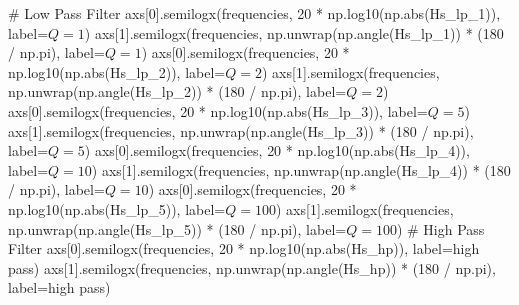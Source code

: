 \documentclass[
  letterpaper,
]{scrbook}
\newenvironment{Shaded}{}{}
\newcommand{\BuiltInTok}[1]{\textcolor[rgb]{0.84,0.23,0.29}{#1}}
\newcommand{\CommentTok}[1]{\textcolor[rgb]{0.42,0.45,0.49}{#1}}
\newcommand{\DecValTok}[1]{\textcolor[rgb]{0.00,0.36,0.77}{#1}}
\newcommand{\NormalTok}[1]{\textcolor[rgb]{0.14,0.16,0.18}{#1}}
\newcommand{\OperatorTok}[1]{\textcolor[rgb]{0.14,0.16,0.18}{#1}}
\newcommand{\StringTok}[1]{\textcolor[rgb]{0.01,0.18,0.38}{#1}}
\begin{document}
\begin{codelisting}
{\begin{Shaded}
\begin{Highlighting}[]
\CommentTok{\# Low Pass Filter}
\NormalTok{axs[}\DecValTok{0}\NormalTok{].semilogx(frequencies, }\DecValTok{20} \OperatorTok{*}\NormalTok{ np.log10(np.}\BuiltInTok{abs}\NormalTok{(Hs\_lp\_1)), label}\OperatorTok{=}\StringTok{\textquotesingle{}$Q = 1$\textquotesingle{}}\NormalTok{)}
\NormalTok{axs[}\DecValTok{1}\NormalTok{].semilogx(frequencies, np.unwrap(np.angle(Hs\_lp\_1)) }\OperatorTok{*}\NormalTok{ (}\DecValTok{180} \OperatorTok{/}\NormalTok{ np.pi), label}\OperatorTok{=}\StringTok{\textquotesingle{}$Q = 1$\textquotesingle{}}\NormalTok{)}
\NormalTok{axs[}\DecValTok{0}\NormalTok{].semilogx(frequencies, }\DecValTok{20} \OperatorTok{*}\NormalTok{ np.log10(np.}\BuiltInTok{abs}\NormalTok{(Hs\_lp\_2)), label}\OperatorTok{=}\StringTok{\textquotesingle{}$Q = 2$\textquotesingle{}}\NormalTok{)}
\NormalTok{axs[}\DecValTok{1}\NormalTok{].semilogx(frequencies, np.unwrap(np.angle(Hs\_lp\_2)) }\OperatorTok{*}\NormalTok{ (}\DecValTok{180} \OperatorTok{/}\NormalTok{ np.pi), label}\OperatorTok{=}\StringTok{\textquotesingle{}$Q = 2$\textquotesingle{}}\NormalTok{)}
\NormalTok{axs[}\DecValTok{0}\NormalTok{].semilogx(frequencies, }\DecValTok{20} \OperatorTok{*}\NormalTok{ np.log10(np.}\BuiltInTok{abs}\NormalTok{(Hs\_lp\_3)), label}\OperatorTok{=}\StringTok{\textquotesingle{}$Q = 5$\textquotesingle{}}\NormalTok{)}
\NormalTok{axs[}\DecValTok{1}\NormalTok{].semilogx(frequencies, np.unwrap(np.angle(Hs\_lp\_3)) }\OperatorTok{*}\NormalTok{ (}\DecValTok{180} \OperatorTok{/}\NormalTok{ np.pi), label}\OperatorTok{=}\StringTok{\textquotesingle{}$Q = 5$\textquotesingle{}}\NormalTok{)}
\NormalTok{axs[}\DecValTok{0}\NormalTok{].semilogx(frequencies, }\DecValTok{20} \OperatorTok{*}\NormalTok{ np.log10(np.}\BuiltInTok{abs}\NormalTok{(Hs\_lp\_4)), label}\OperatorTok{=}\StringTok{\textquotesingle{}$Q = 10$\textquotesingle{}}\NormalTok{)}
\NormalTok{axs[}\DecValTok{1}\NormalTok{].semilogx(frequencies, np.unwrap(np.angle(Hs\_lp\_4)) }\OperatorTok{*}\NormalTok{ (}\DecValTok{180} \OperatorTok{/}\NormalTok{ np.pi), label}\OperatorTok{=}\StringTok{\textquotesingle{}$Q = 10$\textquotesingle{}}\NormalTok{)}
\NormalTok{axs[}\DecValTok{0}\NormalTok{].semilogx(frequencies, }\DecValTok{20} \OperatorTok{*}\NormalTok{ np.log10(np.}\BuiltInTok{abs}\NormalTok{(Hs\_lp\_5)), label}\OperatorTok{=}\StringTok{\textquotesingle{}$Q = 100$\textquotesingle{}}\NormalTok{)}
\NormalTok{axs[}\DecValTok{1}\NormalTok{].semilogx(frequencies, np.unwrap(np.angle(Hs\_lp\_5)) }\OperatorTok{*}\NormalTok{ (}\DecValTok{180} \OperatorTok{/}\NormalTok{ np.pi), label}\OperatorTok{=}\StringTok{\textquotesingle{}$Q = 100$\textquotesingle{}}\NormalTok{)}
\CommentTok{\textquotesingle{}\textquotesingle{}\textquotesingle{}}
\CommentTok{\# High Pass Filter}
\CommentTok{axs[0].semilogx(frequencies, 20 * np.log10(np.abs(Hs\_hp)), label=\textquotesingle{}high pass\textquotesingle{})}
\CommentTok{axs[1].semilogx(frequencies, np.unwrap(np.angle(Hs\_hp)) * (180 / np.pi), label=\textquotesingle{}high pass\textquotesingle{})}


\end{Highlighting}
\end{Shaded}}
\end{codelisting}
\end{document}
